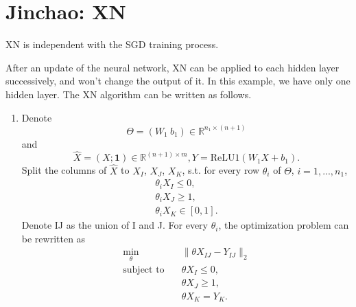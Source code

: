 \newpage
\section{Jinchao: XN}
XN is independent with the SGD training process.

After an update of the neural network, XN can be applied to each hidden layer successively, and won't change the output of it. In this example, we have only one hidden layer. The XN algorithm can be written as follows.
\begin{enumerate}
\item Denote 
$$\Theta=(W_1\ b_1)\in\mathbb{R}^{n_1\times(n+1)}$$
and
$$
\hat X=(X;\mathbf{1})\in\mathbb{R}^{(n+1)\times m}, 
Y=\text{ReLU1}(W_1X+b_1).
$$
	Split the columns of $\hat X$ to $X_I$, $X_J$, $X_K$, s.t. for every row $\theta_i$ of $\Theta$, $i=1,...,n_1$,
	\begin{equation}
	\begin{aligned}
	\theta_i X_I\leq 0,\\
	\theta_i X_J\geq 1,\\
	\theta_i X_K\in[0,1].
	\end{aligned}
	\end{equation}
	Denote IJ as the union of I and J. For every $\theta_i$, the optimization problem can be rewritten as
	\begin{equation}\label{standardv2opt}
	\begin{aligned}
	\min_\theta&\quad\|\theta  X_{IJ}-Y_{IJ}\|_2\\
	\text{subject to}&\quad\theta X_{I}\leq 0,\\
	&\quad\theta X_{J}\geq 1,\\
	&\quad\theta X_{K}=Y_{K}.
	\end{aligned}
	\end{equation}
\end{enumerate}
